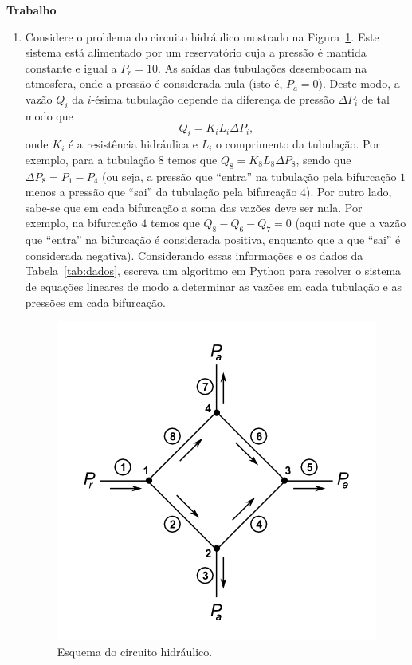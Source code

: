 \documentclass[12pt,a4paper]{article}
\begin{document}
\begin{center}
  \textbf{Trabalho}
\end{center}

\begin{enumerate}
  \item Considere o problema do circuito hidráulico mostrado na Figura~\ref{fig:tub}. Este sistema está alimentado por um reservatório 
cuja a pressão é mantida constante e igual a $P_r = 10$. As saídas das tubulações desembocam na atmosfera, onde a pressão é 
considerada nula (isto é, $P_a = 0$). Deste modo, a vazão $Q_i$ da $i$-ésima tubulação depende da diferença de pressão $\Delta P_i$ 
de tal modo que $$Q_i = K_iL_i\Delta P_i,$$ onde $K_i$ é a resistência hidráulica e $L_i$ o comprimento da tubulação. Por exemplo, para a 
tubulação $8$ temos que $Q_8 = K_8L_8\Delta P_8$, sendo que $\Delta P_8 = P_1 - P_4$ (ou seja, a pressão que ``entra'' na tubulação pela 
bifurcação $1$ menos a pressão que ``sai'' da tubulação pela bifurcação $4$). Por outro lado, sabe-se que em cada bifurcação a soma das vazões 
deve ser nula. Por exemplo, na bifurcação $4$ temos que $Q_8 - Q_6 - Q_7 = 0$ (aqui note que a vazão que ``entra'' na bifurcação é considerada positiva, 
enquanto que a que ``sai'' é considerada negativa). Considerando essas informações e os dados da Tabela~\ref{tab:dados}, escreva um algoritmo em Python para resolver o sistema de equações lineares de modo a determinar 
as vazões em cada tubulação e as pressões em cada bifurcação.

\begin{figure}[!htb]
 \centering
 \includegraphics[scale=0.75]{imagem/tubulacao.png}
 \caption{Esquema do circuito hidráulico.}
 \label{fig:tub}
\end{figure}


\end{enumerate}
\end{document}
